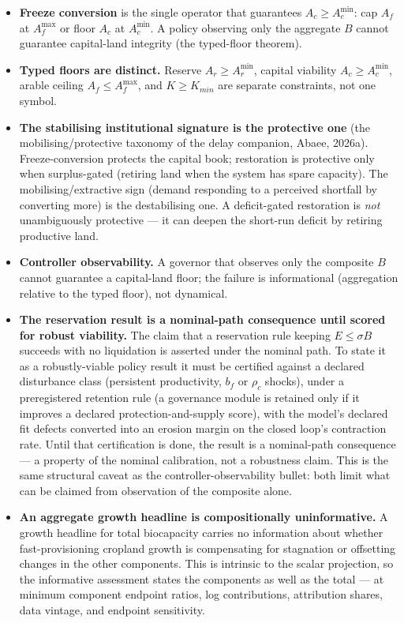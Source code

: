 \documentclass[11pt]{article}
\begin{document}
\begin{itemize}
\item \textbf{Freeze conversion} is the single operator that guarantees $A_c\ge A_c^{\min}$: cap $A_f$ at $A_f^{\max}$ or floor $A_c$ at $A_c^{\min}$. A policy observing only the aggregate $B$ cannot guarantee capital-land integrity (the typed-floor theorem).
\item \textbf{Typed floors are distinct.} Reserve $A_r\ge A_r^{\min}$, capital viability $A_c\ge A_c^{\min}$, arable ceiling $A_f\le A_f^{\max}$, and $K\ge K_{min}$ are separate constraints, not one symbol.
\item \textbf{The stabilising institutional signature is the protective one} (the mobilising/protective taxonomy of the delay companion, Abaee, 2026a). Freeze-conversion protects the capital book; restoration is protective only when surplus-gated (retiring land when the system has spare capacity). The mobilising/extractive sign (demand responding to a perceived shortfall by converting more) is the destabilising one. A deficit-gated restoration is \emph{not} unambiguously protective --- it can deepen the short-run deficit by retiring productive land.
\item \textbf{Controller observability.} A governor that observes only the composite $B$ cannot guarantee a capital-land floor; the failure is informational (aggregation relative to the typed floor), not dynamical.
\item \textbf{The reservation result is a nominal-path consequence until scored for robust viability.} The claim that a reservation rule keeping $E\le\sigma B$ succeeds with no liquidation is asserted under the nominal path. To state it as a robustly-viable policy result it must be certified against a declared disturbance class (persistent productivity, $b_f$ or $\rho_c$ shocks), under a preregistered retention rule (a governance module is retained only if it improves a declared protection-and-supply score), with the model's declared fit defects converted into an erosion margin on the closed loop's contraction rate. Until that certification is done, the result is a nominal-path consequence --- a property of the nominal calibration, not a robustness claim. This is the same structural caveat as the controller-observability bullet: both limit what can be claimed from observation of the composite alone.
\item \textbf{An aggregate growth headline is compositionally uninformative.} A growth headline for total biocapacity carries no information about whether fast-provisioning cropland growth is compensating for stagnation or offsetting changes in the other components. This is intrinsic to the scalar projection, so the informative assessment states the components as well as the total --- at minimum component endpoint ratios, log contributions, attribution shares, data vintage, and endpoint sensitivity.
\end{itemize}
\end{document}
